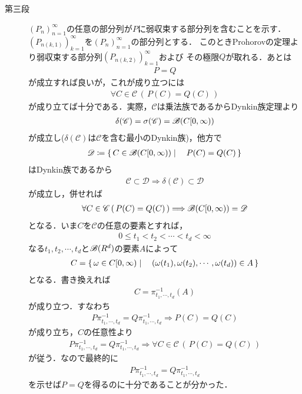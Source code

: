\begin{sketch}
\begin{description}
			\item[第三段]
				$(P_n)_{n=1}^\infty$の任意の部分列が$P$に弱収束する部分列を含むことを示す．
				$\left(P_{n(k,1)}\right)_{k=1}^\infty$を$(P_n)_{n=1}^\infty$の部分列とする．
				このときProhorovの定理より弱収束する部分列$\left(P_{n(k,2)}\right)_{k=1}^\infty$および
				その極限$Q$が取れる．あとは
				\begin{align}
					P = Q
				\end{align}
				が成立すれば良いが，これが成り立つには
				\begin{align}
					\forall C \in \mathscr{C}\, (\, P(C) = Q(C)\, )
				\end{align}
				が成り立てば十分である．実際，$\mathscr{C}$は乗法族であるからDynkin族定理より
				\begin{align}
					\delta(\mathscr{C}) = \sigma(\mathscr{C}) = \mathscr{B}(C[0,\infty))
				\end{align}
				が成立し($\delta(\mathscr{C})$は$\mathscr{C}$を含む最小のDynkin族)，他方で
				\begin{align}
					\mathscr{D} \coloneqq \left\{\, C \in \mathscr{B}(C[0,\infty)) \mid \quad P(C) = Q(C)\, \right\}
				\end{align}
				はDynkin族であるから
				\begin{align}
					\mathscr{C} \subset \mathscr{D} \Longrightarrow \delta(\mathscr{C}) \subset \mathscr{D}
				\end{align}
				が成立し，併せれば
				\begin{align}
					\forall C \in \mathscr{C}\, (\, P(C) = Q(C)\, )
					\Longrightarrow \mathscr{B}(C[0,\infty)) = \mathscr{D} 
				\end{align}
				となる．いま$C$を$\mathscr{C}$の任意の要素とすれば，
				\begin{align}
					0 \leq t_1 < t_2 < \cdots < t_d < \infty
				\end{align}
				なる$t_1,t_2,\cdots,t_d$と$\mathscr{B}(R^d)$の要素$A$によって
				\begin{align}
					C = \left\{\, \omega \in C[0,\infty) \mid \quad (\omega(t_1),\omega(t_2),\cdots,\omega(t_d)) \in A\, \right\}
				\end{align}
				となる．書き換えれば
				\begin{align}
					C = \pi_{t_1,\cdots,t_d}^{-1}(A)
				\end{align}
				が成り立つ．すなわち
				\begin{align}
					P\pi_{t_1,\cdots,t_d}^{-1} = Q\pi_{t_1,\cdots,t_d}^{-1}
					\Longrightarrow P(C) = Q(C)
				\end{align}
				が成り立ち，$C$の任意性より
				\begin{align}
					P\pi_{t_1,\cdots,t_d}^{-1} = Q\pi_{t_1,\cdots,t_d}^{-1}
					\Longrightarrow \forall C \in \mathscr{C}\, (\, P(C) = Q(C)\, )
				\end{align}
				が従う．なので最終的に
				\begin{align}
					P\pi_{t_1,\cdots,t_d}^{-1} = Q\pi_{t_1,\cdots,t_d}^{-1}
					\label{eq:chapter_2_Theorem_4_15_1}
				\end{align}
				を示せば$P=Q$を得るのに十分であることが分かった．
				

\end{description}
\end{sketch}
